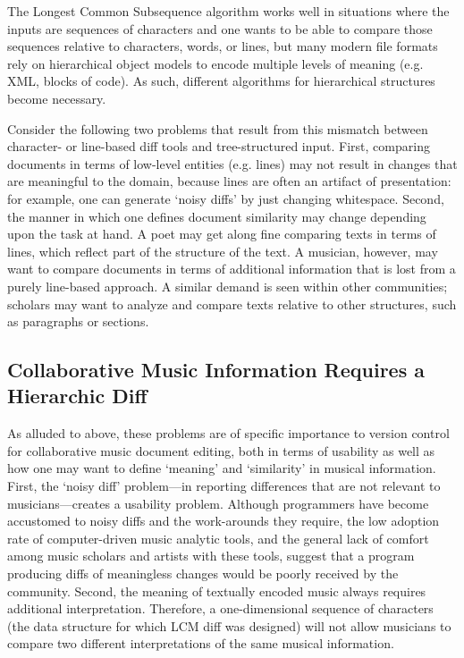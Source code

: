 \documentclass{article}
\begin{document}
The Longest Common Subsequence algorithm works well in situations where
the inputs are sequences of characters and one wants to be
able to compare those sequences relative to characters, words, or
lines, but many modern file formats rely on
hierarchical object models to encode multiple levels of meaning
(e.g. XML, blocks of code).  As such, different algorithms for
hierarchical structures become necessary.  

Consider the following two problems that result from this mismatch
between character- or line-based diff tools and tree-structured input.
First, comparing documents in terms of low-level entities
(e.g. lines) may not result in changes that are meaningful to the
domain, because lines are often an artifact of presentation: for
example, one can generate `noisy diffs' by just changing whitespace.
Second, the manner in which one defines document similarity may change
depending upon the task at hand.  A poet may get along fine comparing
texts in terms of lines, which reflect part of the structure of the
text.  A musician, however, may want to compare documents in terms of
additional information that is lost from a purely line-based approach.
A similar demand is seen within other communities; scholars may want
to analyze and compare texts relative to other structures, such as
paragraphs or sections.

\subsection{Collaborative Music Information Requires a Hierarchic Diff}
As alluded to above, these problems are of specific importance to version control for collaborative music document editing, both in terms of usability as well as how one may want
to define `meaning' and `similarity' in musical information.  First,
the `noisy diff' problem---in reporting differences that are not
relevant to musicians---creates a usability problem.  Although
programmers have become accustomed to noisy diffs and the work-arounds
they require, the low adoption rate of computer-driven music analytic
tools, and the general lack of comfort among music scholars and artists with these
tools, suggest that a program producing diffs of meaningless changes
would be poorly received by the community.  Second, the meaning of
textually encoded music always requires additional interpretation.
Therefore, a one-dimensional sequence of characters (the data
structure for which LCM diff was designed) will not allow
musicians to compare two different interpretations of the same musical information.  
\end{document}
